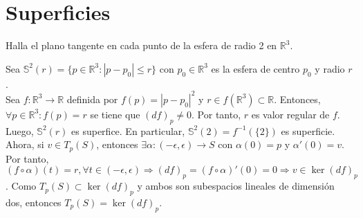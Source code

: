 \chapter{Superficies}

\begin{ejr}[1]
  Halla el plano tangente en cada punto de la esfera de radio 2 en $\mathbb{R}^{3}$.
\end{ejr}

\begin{sol}
  Sea $\mathbb{S}^{2}(r) = \{ p \in \mathbb{R}^{3} : |p - p_{0}| \leq r \}$ con $p_{0} \in \mathbb{R}^{3}$ es la esfera de centro $p_{0}$ y radio $r$. \\

  Sea $f : \mathbb{R}^{3} \to \mathbb{R}$ definida por $f(p) = | p - p_{0} |^{2}$ y $r \in f(\mathbb{R}^{3}) \subset \mathbb{R}$. Entonces, $\forall p \in \mathbb{R}^{3} : f(p) = r$ se tiene que $(d f)_{p} \neq 0$. Por tanto, $r$ es valor regular de $f$. Luego, $\mathbb{S}^{2}(r)$ es superfice. En particular, $\mathbb{S}^{2}(2) = f^{-1}(\{ 2 \})$ es superficie. \\

  Ahora, si $v \in T_{p}(S)$, entonces $\exists \alpha : (-\epsilon, \epsilon) \to S$ con $\alpha(0) = p$ y $\alpha'(0) = v$. Por tanto, $(f \circ \alpha)(t) = r, \forall t \in (-\epsilon, \epsilon) \Rightarrow (d f)_{p} = (f \circ \alpha)'(0) = 0 \Rightarrow v \in \ker (d f)_{p}$. Como $T_{p}(S) \subset \ker (d f)_{p}$ y ambos son subespacios lineales de dimensión dos, entonces $T_{p}(S) = \ker (d f)_{p}$.
\end{sol}
